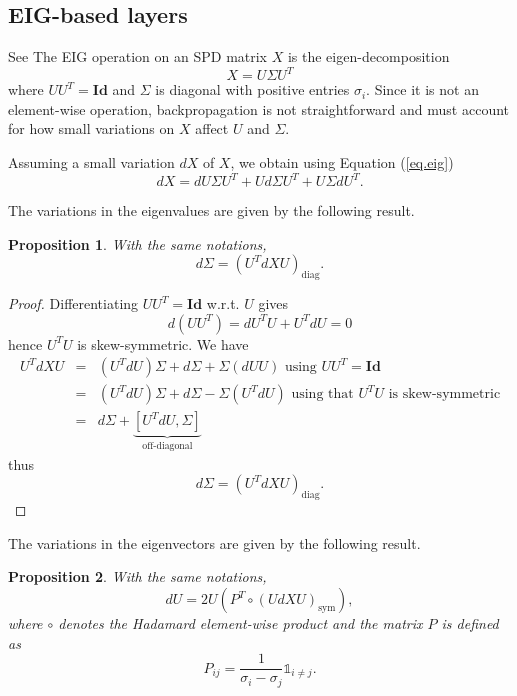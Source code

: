 \documentclass[10pt,a4paper]{book}
\theoremstyle{definition}
\theoremstyle{plain}
\newtheorem{prop}{Proposition}[section]
\theoremstyle{remark}
\newcommand{\Id}{\mathrm{\textbf{Id}}}
\begin{document}
\subsection{EIG-based layers}
See \cite{ionescu2015matrix}
The EIG operation on an SPD matrix $X$ is the eigen-decomposition 
\begin{equation}\label{eq.eig}
    X=U\Sigma U^T
\end{equation}
where $UU^T=\Id$ and $\Sigma$ is diagonal with positive entries $\sigma_i$. Since it is not an element-wise operation, backpropagation is not straightforward and must account for how small variations on $X$ affect $U$ and $\Sigma$. 

Assuming a small variation $dX$ of $X$, we obtain using Equation (\ref{eq.eig})
$$
dX=dU\Sigma U^T+Ud\Sigma U^T+U\Sigma dU^T.
$$

The variations in the eigenvalues are given by the following result.
\begin{prop}
With the same notations,
$$d\Sigma=(U^T dX U)_{\text{diag}}.$$
\end{prop}
\begin{proof}
Differentiating $UU^T=\Id$ w.r.t. $U$ gives
$$d(UU^T)=dU^T U +U^T dU =0$$
hence $U^T U$ is skew-symmetric. 
We have 
\begin{eqnarray*}
    U^T dX U&=& (U^T dU)\Sigma +d\Sigma +\Sigma (dU U)\text{  using } UU^T = \Id\\
    &=& (U^T dU)\Sigma +d\Sigma -\Sigma(U^T dU) \text{  using that } U^TU \text{ is skew-symmetric}\\
    &=&d\Sigma+\underbrace{[U^TdU,\Sigma]}_{\text{off-diagonal}}
\end{eqnarray*}
thus
$$d\Sigma=(U^T dX U)_{\text{diag}}.$$
\end{proof}

The variations in the eigenvectors are given by the following result.
\begin{prop}
    With the same notations,
    $$dU=2U(P^T \circ (U dX U)_{\text{sym}}),$$
    where $\circ$ denotes the Hadamard element-wise product and the matrix $P$ is defined as
    $$P_{ij}=\frac{1}{\sigma_i-\sigma_j}\mathds{1}_{i\neq j}.$$
    \end{prop}
    
\end{document}
